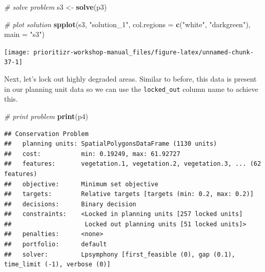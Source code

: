 \documentclass[12pt,]{book}
\newenvironment{Shaded}{\begin{snugshade}}{\end{snugshade}}
\newcommand{\KeywordTok}[1]{\textcolor[rgb]{0.13,0.29,0.53}{\textbf{#1}}}
\newcommand{\DataTypeTok}[1]{\textcolor[rgb]{0.13,0.29,0.53}{#1}}
\newcommand{\FloatTok}[1]{\textcolor[rgb]{0.00,0.00,0.81}{#1}}
\newcommand{\StringTok}[1]{\textcolor[rgb]{0.31,0.60,0.02}{#1}}
\newcommand{\CommentTok}[1]{\textcolor[rgb]{0.56,0.35,0.01}{\textit{#1}}}
\newcommand{\OtherTok}[1]{\textcolor[rgb]{0.56,0.35,0.01}{#1}}
\newcommand{\OperatorTok}[1]{\textcolor[rgb]{0.81,0.36,0.00}{\textbf{#1}}}
\newcommand{\NormalTok}[1]{#1}
\begin{document}
\begin{Shaded}
\begin{Highlighting}[]
\CommentTok{# solve problem}
\NormalTok{s3 <-}\StringTok{ }\KeywordTok{solve}\NormalTok{(p3)}

\CommentTok{# plot solution}
\KeywordTok{spplot}\NormalTok{(s3, }\StringTok{"solution_1"}\NormalTok{, }\DataTypeTok{col.regions =} \KeywordTok{c}\NormalTok{(}\StringTok{"white"}\NormalTok{, }\StringTok{"darkgreen"}\NormalTok{), }\DataTypeTok{main =} \StringTok{"s3"}\NormalTok{)}
\end{Highlighting}
\end{Shaded}

\begin{center}\texttt{[image: prioritizr-workshop-manual\_files/figure-latex/unnamed-chunk-37-1]} \end{center}

Next, let's lock out highly degraded areas. Similar to before, this data
is present in our planning unit data so we can use the
\texttt{locked\_out} column name to achieve this.

\begin{Shaded}
\end{Shaded}

\begin{Shaded}
\begin{Highlighting}[]
\CommentTok{# print problem}
\KeywordTok{print}\NormalTok{(p4)}
\end{Highlighting}
\end{Shaded}

\begin{verbatim}
## Conservation Problem
##   planning units: SpatialPolygonsDataFrame (1130 units)
##   cost:           min: 0.19249, max: 61.92727
##   features:       vegetation.1, vegetation.2, vegetation.3, ... (62 features)
##   objective:      Minimum set objective 
##   targets:        Relative targets [targets (min: 0.2, max: 0.2)]
##   decisions:      Binary decision 
##   constraints:    <Locked in planning units [257 locked units]
##                    Locked out planning units [51 locked units]>
##   penalties:      <none>
##   portfolio:      default
##   solver:         Lpsymphony [first_feasible (0), gap (0.1), time_limit (-1), verbose (0)]
\end{verbatim}
\end{document}
